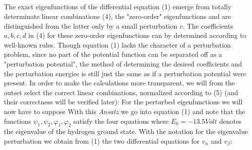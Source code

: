 \begin{paper}{1}
\subsection{} The exact eigenfunctions of the differential equation (1) emerge from totally determinate linear combinations (4), the "zero-order" eigenfunctions and are distinguished from the latter only by a small perturbation $v$. The coefficients $a,b,c,d$ in (4) for these zero-order eigenfunctions can by determined according to well-known rules. Though equation (1) lacks the character of a perturbation problem, since no part of the potential function can be separated off as a "perturbation potential", the method of determining the desired coefficients and the perturbation energies is still just the same as if a perturbation potential were present. In order to make the calculations more transparent, we will from the outset select the correct linear combinations, normalized according to (5) (and their correctness will be verified later):
For the perturbed eigenfunctions we will now have to suppose
With this \textit{Ansatz} we go into equation (1) and note that the functions $\psi_1,\psi_2,\varphi_1,\varphi_2$ satisfy the four equations
where $E_0=-13.5\unit{Volt}$ denotes the eigenvalue of the hydrogen ground state. With the notation
for the eigenvalue perturbation we obtain from (1) the two differential equations for $v_\alpha$ and $v_\beta$:


\end{paper}
